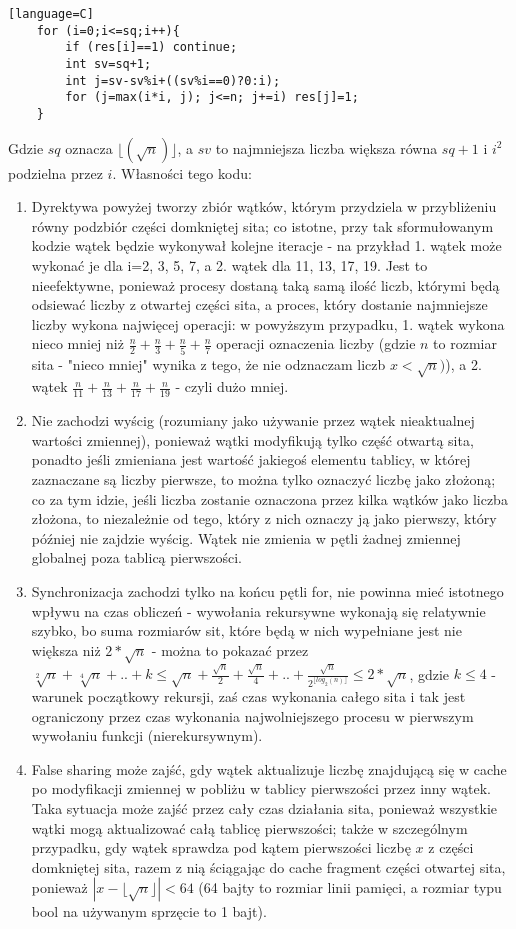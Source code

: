 \documentclass[12pt]{article}
\begin{document}
\begin {enumerate}
\begin{lstlisting}[style=mystyle, caption= Sito funkcyjne ze static schedulingiem][language=C]
	for (i=0;i<=sq;i++){
		if (res[i]==1) continue;
		int sv=sq+1;
		int j=sv-sv%i+((sv%i==0)?0:i);
		for (j=max(i*i, j); j<=n; j+=i) res[j]=1;
	}
	\end{lstlisting}
	Gdzie \(sq\) oznacza \(\lfloor(\sqrt{n})\rfloor\), a \(sv\) to najmniejsza liczba większa równa \(sq+1\) i \(i^2\) podzielna przez \(i\). Własności tego kodu:
	\begin{enumerate}
		\item Dyrektywa powyżej tworzy zbiór wątków, którym przydziela w przybliżeniu równy podzbiór części domkniętej sita; co istotne, przy tak sformułowanym kodzie wątek będzie wykonywał kolejne iteracje - na przykład 1. wątek może wykonać je dla i=2, 3, 5, 7, a 2. wątek dla 11, 13, 17, 19. Jest to nieefektywne, ponieważ procesy dostaną taką samą ilość liczb, którymi będą odsiewać liczby z otwartej części sita, a proces, który dostanie najmniejsze liczby wykona najwięcej operacji: w powyższym przypadku, 1. wątek wykona nieco mniej niż \(\frac{n}{2}+\frac{n}{3}+\frac{n}{5}+\frac{n}{7}\) operacji oznaczenia liczby (gdzie \(n\) to rozmiar sita - "nieco mniej" wynika z tego, że nie odznaczam liczb \(x<\sqrt{n})\)), a 2. wątek \(\frac{n}{11}+\frac{n}{13}+\frac{n}{17}+\frac{n}{19}\) - czyli dużo mniej.
		\item Nie zachodzi wyścig (rozumiany jako używanie przez wątek nieaktualnej wartości zmiennej), ponieważ wątki modyfikują tylko część otwartą sita, ponadto jeśli zmieniana jest wartość jakiegoś elementu tablicy, w której zaznaczane są liczby pierwsze, to można tylko oznaczyć liczbę jako złożoną; co za tym idzie, jeśli liczba zostanie oznaczona przez kilka wątków jako liczba złożona, to niezależnie od tego, który z nich oznaczy ją jako pierwszy, który później nie zajdzie wyścig. Wątek nie zmienia w pętli żadnej zmiennej globalnej poza tablicą pierwszości.
		\item Synchronizacja zachodzi tylko na końcu pętli for, nie powinna mieć istotnego wpływu na czas obliczeń - wywołania rekursywne wykonają się relatywnie szybko, bo suma rozmiarów sit, które będą w nich wypełniane jest nie większa niż \(2*\sqrt{n}\) - można to pokazać przez \(\sqrt[2]{n}+\sqrt[4]{n}+..+k\le\sqrt{n}+\frac{\sqrt{n}}{2}+\frac{\sqrt{n}}{4}+..+\frac{\sqrt{n}}{2^{\lfloor log_2(n) \rfloor}}\le 2*\sqrt{n}\), gdzie \(k \le 4\) - warunek początkowy rekursji, zaś czas wykonania całego sita i tak jest ograniczony przez czas wykonania najwolniejszego procesu w pierwszym wywołaniu funkcji (nierekursywnym).
		\item False sharing może zajść, gdy wątek aktualizuje liczbę znajdującą się w cache po modyfikacji zmiennej w pobliżu w tablicy pierwszości przez inny wątek. Taka sytuacja może zajść przez cały czas działania sita, ponieważ wszystkie wątki mogą aktualizować całą tablicę pierwszości; także w szczególnym przypadku, gdy wątek sprawdza pod kątem pierwszości liczbę \(x\) z części domkniętej sita, razem z nią ściągając do cache fragment części otwartej sita, ponieważ \(|x-\lfloor\sqrt{n}\rfloor|<64\) (64 bajty to rozmiar linii pamięci, a rozmiar typu bool na używanym sprzęcie to 1 bajt).

\end{enumerate}
\end{enumerate}
\end{document}
